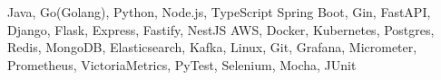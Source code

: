 

\addvspace{-1.5ex}
\begin{cvskills}
    {Java, Go(Golang), Python, Node.js, TypeScript}
    {Spring Boot, Gin, FastAPI, Django, Flask, Express, Fastify, NestJS}
    {AWS, Docker, Kubernetes, Postgres, Redis, MongoDB, Elasticsearch, Kafka, Linux, Git, 
    Grafana, Micrometer, Prometheus, VictoriaMetrics, PyTest, Selenium, Mocha, JUnit}
\end{cvskills}